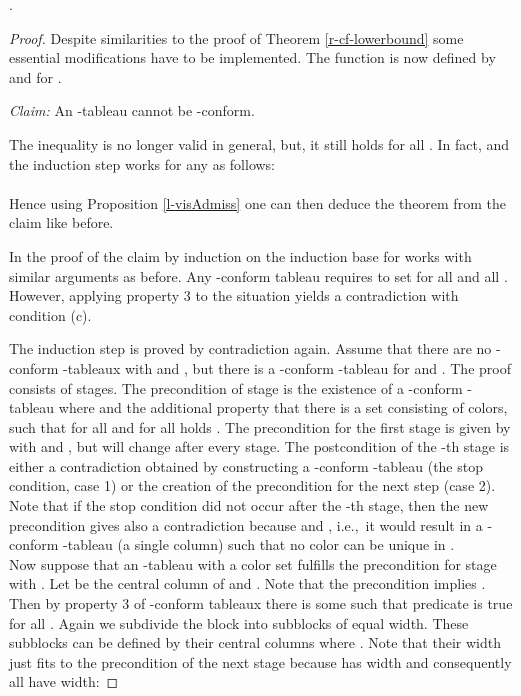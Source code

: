 \documentclass[a4paper,USenglish,numberwithinsect]{lipics}
\theoremstyle{plain}
\begin{document}
\begin{theorem}
\label{l-cf-lowerbound}
.
\end{theorem}
\begin{proof}
Despite similarities to the proof of Theorem
\ref{r-cf-lowerbound}
some essential modifications have to be implemented.
The function   is now
defined by  and
 for
 .

\noindent
{\em Claim:} An -tableau cannot be -conform.
 

\noindent
The inequality  is no longer valid in general,
but, it still holds for all . In fact, 
and the  induction
step works for any  as follows:
\\

\\
Hence using Proposition \ref{l-visAdmiss} one can then deduce the theorem
from the claim like before.

\noindent
In the  proof of the claim  by induction on   the induction base for
 works
with similar arguments as before. Any -conform  tableau
requires to set  for all  and all .
However, applying property 3 to the situation  
yields a contradiction with condition (c).

The induction step is proved by contradiction again. Assume 
that  there are no -conform
-tableaux with  and , but there  is
a -conform
-tableau  for  and .
The proof consists of  stages. The precondition of stage 
is the existence of a -conform -tableau
where  and the additional property that there is a
set 
consisting of  colors, such that for all  and for all
 holds . The precondition for the first
stage is given by  
 with  and , but  will
change after every stage.
The postcondition  of the -th stage
is either a contradiction obtained by constructing a   -conform
-tableau (the stop condition, case 1) or the creation of
the precondition for the next step
(case 2). Note that if the stop condition did not occur after the -th
stage, then
the new precondition gives also a contradiction because
 and , i.e.,~it would result in  a -conform
-tableau (a single column) such that no color can be  unique
in .
\\
Now suppose that an  -tableau  with a
color set   fulfills   the
precondition for stage   with .
Let  be the central column of  and
.
Note that the precondition implies . Then by 
property 3 of -conform
tableaux there is some  such that predicate
 is true
for all . Again we subdivide the block 
into  subblocks of equal width. These subblocks can be
defined by their central columns
 where . Note that their width  just fits to the
precondition of the next stage because  has width
 and
consequently all    have width:
  

\end{proof}
\end{document}
